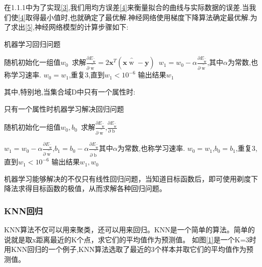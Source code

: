 在1.1.1中为了实现\ref{3},我们用均方误差\ref{4}来衡量拟合的曲线与实际数据的误差.当我们使\ref{4}取得最小值时,也就确定了最优解.神经网络使用梯度下降算法确定最优解.为了求出\ref{5},神经网络模型的计算步骤如下:



\clearpage


\begin{algorithm}[h]
	\caption{机器学习回归问题}
	\label{alg:4}
	\begin{algorithmic}[1]
		\STATE 随机初始化一组值$w_0$\
		\STATE 求解$\frac{\partial E_{\mathop{w}\limits^{\^{}}}}{\partial \mathop{w}\limits^{\^{}}}=2\textbf{x}^T(\textbf{x}\mathop{w}\limits^{\^{}}-\textbf{y})$\
		\STATE $w_1=w_0-\alpha \frac{\partial E_{\mathop{w}\limits^{\^{}}}}{\partial \mathop{w}\limits^{\^{}}}$,其中$\alpha$为常数,也称学习速率.
		\STATE $w_0=w_1$,重复3,直到$w_1<10^{-6}$
		\STATE 输出结果$w_1$
	\end{algorithmic}
\end{algorithm}





其中,特别地,当集合域D中只有一个属性时:
\begin{algorithm}[h]
	\caption{只有一个属性时机器学习解决回归问题}
	\label{alg:4}
	\begin{algorithmic}[1]
		\STATE 随机初始化一组值$w_0,b_0$\
		\STATE 求解$\frac{\partial E_{\mathop{w}\limits^{\^{}}}}{\partial \mathop{w}\limits^{\^{}}}$,$\frac{\partial E_{\mathop{w}\limits^{\^{}}}}{\partial \mathop{b}}$
		
		
		
		\STATE $w_1=w_0-\alpha \frac{\partial E_{\mathop{w}\limits^{\^{}}}}{\partial \mathop{w}\limits^{\^{}}}$,$b_1=b_0-\alpha \frac{\partial E_{\mathop{w}\limits^{\^{}}}}{\partial \mathop{b}\limits^{\^{}}}$其中$\alpha$为常数,也称学习速率.
		\STATE $w_0=w_1$,$b_0=b_1$,重复3,直到$w_1<10^{-6}$
		\STATE 输出结果$w_1,w_0$
	\end{algorithmic}
\end{algorithm}

机器学习能够解决的不仅只有线性回归问题，当知道目标函数后，即可使用剃度下降法求得目标函数的极值，从而求解各种回归问题。


\subsubsection{KNN回归}
KNN算法不仅可以用来聚类，还可以用来回归。KNN是一个简单的算法。简单的说就是取x距离最近的K个点，求它们的平均值作为预测值。
如图\ref{1}是一个K=3时用KNN回归的一个例子,KNN算法选取了最近的3个样本并取它们的平均值作为预测值。

